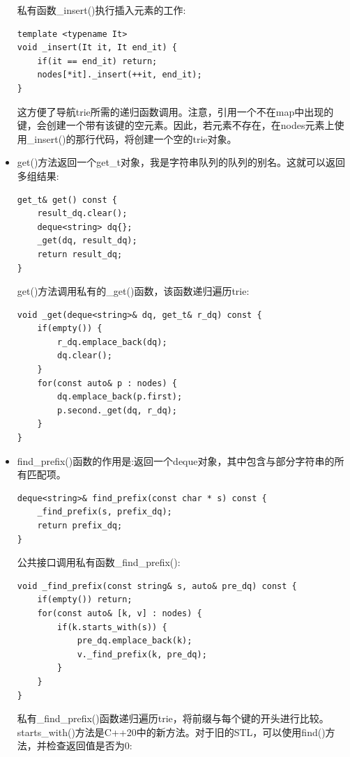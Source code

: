 \begin{itemize}
私有函数\_insert()执行插入元素的工作:

\begin{lstlisting}[style=styleCXX]
template <typename It>
void _insert(It it, It end_it) {
	if(it == end_it) return;
	nodes[*it]._insert(++it, end_it);
}
\end{lstlisting}

这方便了导航trie所需的递归函数调用。注意，引用一个不在map中出现的键，会创建一个带有该键的空元素。因此，若元素不存在，在nodes元素上使用\_insert()的那行代码，将创建一个空的trie对象。

\item 
get()方法返回一个get\_t对象，我是字符串队列的队列的别名。这就可以返回多组结果:

\begin{lstlisting}[style=styleCXX]
get_t& get() const {
	result_dq.clear();
	deque<string> dq{};
	_get(dq, result_dq);
	return result_dq;
}
\end{lstlisting}

get()方法调用私有的\_get()函数，该函数递归遍历trie:

\begin{lstlisting}[style=styleCXX]
void _get(deque<string>& dq, get_t& r_dq) const {
	if(empty()) {
		r_dq.emplace_back(dq);
		dq.clear();
	}
	for(const auto& p : nodes) {
		dq.emplace_back(p.first);
		p.second._get(dq, r_dq);
	}
}
\end{lstlisting}

\item 
find\_prefix()函数的作用是:返回一个deque对象，其中包含与部分字符串的所有匹配项。

\begin{lstlisting}[style=styleCXX]
deque<string>& find_prefix(const char * s) const {
	_find_prefix(s, prefix_dq);
	return prefix_dq;
}
\end{lstlisting}

公共接口调用私有函数\_find\_prefix():

\begin{lstlisting}[style=styleCXX]
void _find_prefix(const string& s, auto& pre_dq) const {
	if(empty()) return;
	for(const auto& [k, v] : nodes) {
		if(k.starts_with(s)) {
			pre_dq.emplace_back(k);
			v._find_prefix(k, pre_dq);
		}
	}
}
\end{lstlisting}

私有\_find\_prefix()函数递归遍历trie，将前缀与每个键的开头进行比较。starts\_with()方法是C++20中的新方法。对于旧的STL，可以使用find()方法，并检查返回值是否为0:


\end{itemize}
